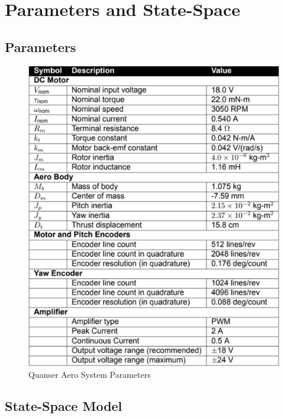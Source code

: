 \chapter{Parameters and State-Space}
\label{ch: AppendixA}

\section{Parameters}

\begin{figure}[!htbp]
 \begin{center}
  \includegraphics[scale=.75]{figs/img/quanserAeroSystemParameters}
 \end{center}
\caption{Quanser Aero System Parameters}
\label{fig.systemParameters}
\end{figure}



\section{State-Space Model}





